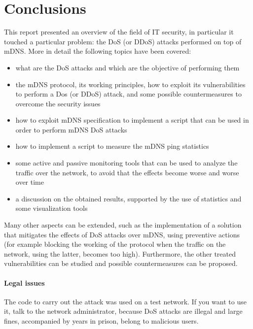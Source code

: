 \documentclass[fleqn, 11pt]{SelfArx} %
\begin{document}
\section{Conclusions}
This report presented an overview of the field of IT security, in particular it touched a particular problem: the DoS (or DDoS) attacks performed on top of mDNS. \newline
More in detail the following topics have been covered:
\begin{itemize}[leftmargin=*]
	\item what are the DoS attacks and which are the objective of performing them 
	\item the mDNS protocol, its working principles, how to exploit its vulnerabilities to perform a Dos (or DDoS) attack, and some possible 
		  countermeasures to overcome the security issues
 	\item how to exploit mDNS specification to implement a script that can be used in order to perform mDNS DoS attacks
 	\item how to implement a script to measure the mDNS ping statistics
	\item some active and passive monitoring tools that can be used to analyze the traffic over the network,
	      to avoid that the effects become worse and worse over time
 	\item a discussion on the obtained results, supported by the use of statistics and some visualization tools
\end{itemize}

Many other aspects can be extended, such as the implementation of a solution that mitigates the effects of DoS attacks over mDNS, using preventive actions 
(for example blocking the working of the protocol when the traffic on the network, using the latter, becomes too high).
Furthermore, the other treated vulnerabilities can be studied and possible countermeasures can be proposed.

\paragraph{Legal issues \cite{IllegalIssues}} The code to carry out the attack was used on a test network. If you want to use it, talk to the network administrator, because DoS attacks are illegal and large fines, accompanied by years in prison, belong to malicious users.




\end{document}
